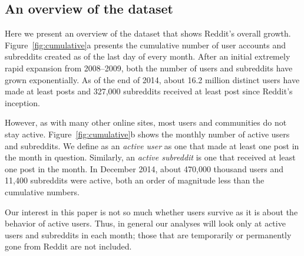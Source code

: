 \subsection{An overview of the dataset}

Here we present an overview of the dataset that shows Reddit's overall growth.  Figure~\ref{fig:cumulative}a presents the cumulative number of user accounts and subreddits created as of the last day of every month. After an initial extremely rapid expansion from 2008--2009, both the number of users and subreddits have grown exponentially.  As of the end of 2014, about 16.2 million distinct users have made at least posts and 327,000 subreddits received at least post since Reddit's inception.

However, as with many other online sites, most users \cite{} and communities \cite{butler_kraut_paper} do not stay active. Figure~\ref{fig:cumulative}b shows the monthly number of active users and subreddits.
We define as an \textit{active user} as one that made at least one post in the month in question. Similarly, an \textit{active subreddit} is one that received at least one post in the month. In December 2014, about 470,000 thousand users and 11,400 subreddits were active, both an order of magnitude less than the cumulative numbers.  

Our interest in this paper is not so much whether users survive as it is about the behavior of active users.  Thus, 
in general our analyses will look only at active users and subreddits in each month; those that are temporarily or permanently gone from Reddit are not included.  



